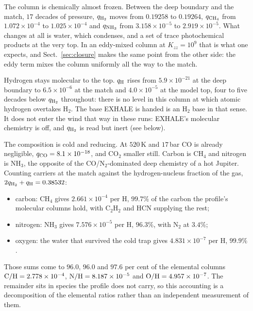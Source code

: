 \documentclass[english,a4paper]{my_memo}
\begin{document}
\medskip
\noindent The column is chemically almost frozen. Between the deep boundary
and the match, $17$ decades of pressure, $q_{\rm H_2}$ moves from $0.19258$
to $0.19264$, $q_{\rm CH_4}$ from $1.072\times10^{-4}$ to
$1.025\times10^{-4}$ and $q_{\rm NH_3}$ from $3.158\times10^{-5}$ to
$2.919\times10^{-5}$. What changes at all is water, which condenses, and a
set of trace photochemical products at the very top. In an eddy-mixed column
at $K_{zz} = 10^{9}$ that is what one expects, and Sect.~\ref{sec:closure}
makes the same point from the other side: the eddy term mixes the column
uniformly all the way to the match.

\medskip
\noindent Hydrogen stays molecular to the top. $q_{\rm H}$ rises from
$5.9\times10^{-21}$ at the deep boundary to $6.5\times10^{-6}$ at the match
and $4.0\times10^{-5}$ at the model top, four to five decades below
$q_{\rm H_2}$ throughout: there is no level in this column at which atomic
hydrogen overtakes H$_2$. The base EXHALE is handed is an H$_2$ base in that
sense. It does not enter the wind that way in these runs: EXHALE's molecular
chemistry is off, and $q_{\rm H_2}$ is read but inert (see below).

\medskip
\medskip
\noindent The composition is cold and reducing. At $520$\,K and $17$\,bar CO
is already negligible, $q_{\rm CO} = 8.1\times10^{-18}$, and CO$_2$ smaller
still. Carbon is CH$_4$ and nitrogen is NH$_3$, the opposite of the
CO/N$_2$-dominated deep chemistry of a hot Jupiter. Counting carriers at the
match against the hydrogen-nucleus fraction of the gas,
$2q_{\rm H_2} + q_{\rm H} = 0.38532$:
\begin{itemize}\itemsep0.2ex
\item carbon: CH$_4$ gives $2.661\times10^{-4}$ per H, $99.7\%$ of the
      carbon the profile's molecular columns hold, with C$_2$H$_2$ and HCN
      supplying the rest;
\item nitrogen: NH$_3$ gives $7.576\times10^{-5}$ per H, $96.3\%$, with
      N$_2$ at $3.4\%$;
\item oxygen: the water that survived the cold trap gives
      $4.831\times10^{-7}$ per H, $99.9\%$.
\end{itemize}
Those sums come to $96.0$, $96.0$ and $97.6$ per cent of the elemental
columns ${\rm C/H} = 2.778\times10^{-4}$, ${\rm N/H} = 8.187\times10^{-5}$
and ${\rm O/H} = 4.957\times10^{-7}$. The remainder sits in species the
profile does not carry, so this accounting is a decomposition of the
elemental ratios rather than an independent measurement of them.
\end{document}
